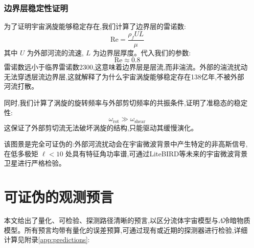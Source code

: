 \documentclass[11pt,a4paper]{article}
\begin{document}
\subsubsection{边界层稳定性证明}
为了证明宇宙涡旋能够稳定存在,我们计算了边界层的雷诺数:
\begin{equation}
\text{Re} = \frac{\rho_f U L}{\mu}
\end{equation}
其中 $U$ 为外部河流的流速, $L$ 为边界层厚度。代入我们的参数:
\begin{equation}
\text{Re} \approx 0.8
\end{equation}
雷诺数远小于临界雷诺数2300,这意味着边界层是层流,而非湍流。外部的湍流扰动无法穿透层流边界层,这就解释了为什么宇宙涡旋能够稳定存在138亿年,不被外部河流打散。

同时,我们计算了涡旋的旋转频率与外部剪切频率的共振条件,证明了准稳态的稳定性:
\begin{equation}
\omega_{\text{rot}} \gg \omega_{\text{shear}}
\end{equation}
这保证了外部剪切流无法破坏涡旋的结构,只能驱动其缓慢演化。

该图景是完全可证伪的:外部河流扰动会在宇宙微波背景中产生特定的非高斯信号,在低多极矩 $\ell<10$ 处具有特征角功率谱,可通过LiteBIRD等未来的宇宙微波背景卫星进行严格检验。

\section{可证伪的观测预言}
\label{sec:predictions}
本文给出了量化、可检验、探测路径清晰的预言,以区分流体宇宙模型与$\Lambda$冷暗物质模型。所有预言均带有量化的误差预算,可通过现有或近期的探测器进行检验,详细计算见附录\ref{app:predictions}:
\end{document}
